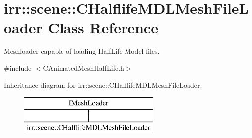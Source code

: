 \hypertarget{classirr_1_1scene_1_1_c_halflife_m_d_l_mesh_file_loader}{\section{irr\-:\-:scene\-:\-:C\-Halflife\-M\-D\-L\-Mesh\-File\-Loader Class Reference}
\label{classirr_1_1scene_1_1_c_halflife_m_d_l_mesh_file_loader}
}


Meshloader capable of loading Half\-Life Model files.  




{\ttfamily \#include $<$C\-Animated\-Mesh\-Half\-Life.\-h$>$}

Inheritance diagram for irr\-:\-:scene\-:\-:C\-Halflife\-M\-D\-L\-Mesh\-File\-Loader\-:\begin{figure}[H]
\begin{center}
\leavevmode
\includegraphics[height=2.000000cm]{classirr_1_1scene_1_1_c_halflife_m_d_l_mesh_file_loader}
\end{center}
\end{figure}
